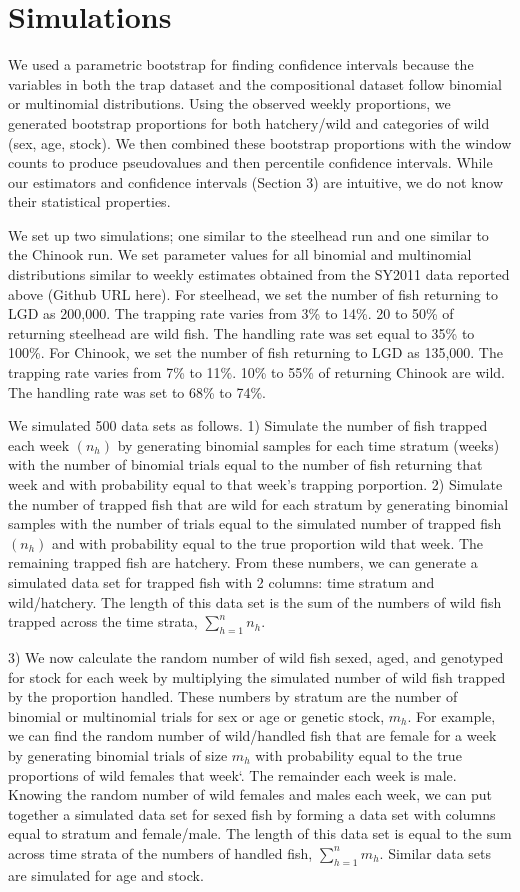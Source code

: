 \documentclass[12pt]{article}
\begin{document}
\section{Simulations}

We used a parametric bootstrap for finding confidence intervals because the variables in both the trap dataset and the compositional dataset follow binomial or multinomial distributions. Using the observed weekly proportions, we generated bootstrap proportions for both  hatchery/wild and categories of wild (sex, age, stock). We then combined these bootstrap proportions with the window counts to produce pseudovalues and then percentile confidence intervals. While our estimators and confidence intervals (Section 3) are intuitive, we do not know their statistical properties.

We set up two simulations; one similar to the steelhead run and one similar to the Chinook run. We set parameter values for all binomial and multinomial distributions similar to weekly estimates obtained from the SY2011 data reported above (Github URL here). For steelhead, we set the number of fish returning to LGD as 200,000. The trapping rate varies from 3\% to 14\%. 20 to 50\% of returning steelhead are wild fish. The handling rate was set equal to 35\% to 100\%. For Chinook, we set the number of fish returning to LGD as 135,000. The trapping rate varies from 7\% to 11\%. 10\% to 55\% of returning Chinook are wild. The handling rate was set to 68\% to 74\%.

We simulated 500 data sets as follows. 1) Simulate the number of fish trapped each week $(n_h)$ by generating binomial samples for each time stratum (weeks) with the number of binomial trials equal to the number of fish returning that week and with probability equal to that week's trapping porportion. 2) Simulate the number of trapped fish that are wild for each stratum by generating binomial samples with the number of trials equal to the simulated number of trapped fish $(n_h)$ and with probability equal to the true proportion wild that week. The remaining trapped fish are hatchery. From these numbers, we can generate a simulated data set for trapped fish with 2 columns: time stratum and wild/hatchery. The length of this data set is the sum of the numbers of wild fish trapped across the time strata, \(\sum\limits_{h=1}^{n} n_h\).

3) We now calculate the random number of wild fish sexed, aged, and genotyped for stock for each week by multiplying the simulated number of wild fish trapped by the proportion handled. These numbers by stratum are the number of binomial or multinomial trials for sex or age or genetic stock, \(m_h\). For example, we can find the random number of wild/handled fish that are female for a week by generating binomial trials of size \(m_h\) with probability equal to the true proportions of wild females that week`. The remainder each week is male. Knowing the random number of wild females and males each week, we can put together a simulated data set for sexed fish by forming a data set with columns equal to stratum and female/male. The length of this data set is equal to the sum across time strata of the numbers of handled fish,  \(\sum\limits_{h=1}^{n} m_h\). Similar data sets are simulated for age and stock.
\end{document}
